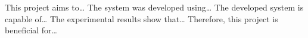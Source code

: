 %

This project aims to\ldots{} The system was developed using\ldots{} The developed system is capable of\ldots{} The experimental results show that\ldots{} Therefore, this project is beneficial for\ldots{}
